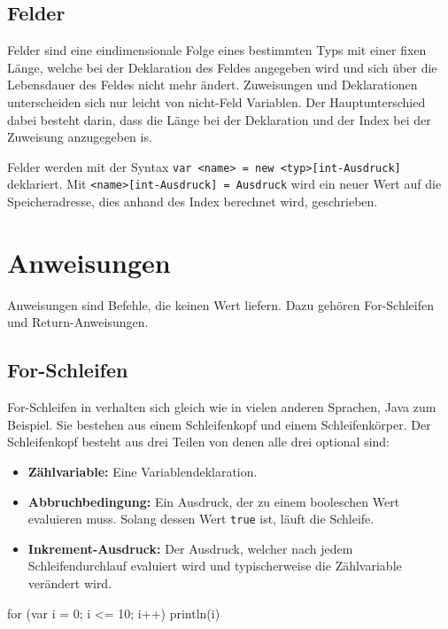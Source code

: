 \subsection{Felder}

Felder sind eine eindimensionale Folge eines bestimmten Typs mit einer fixen Länge, welche bei der Deklaration des Feldes angegeben wird und sich über die Lebensdauer des Feldes nicht mehr ändert. Zuweisungen und Deklarationen unterscheiden sich nur leicht von nicht-Feld Variablen. Der Hauptunterschied dabei besteht darin, dass die Länge bei der Deklaration und der Index bei der Zuweisung anzugegeben is.

Felder werden mit der Syntax \texttt{var <name> = new <typ>[int-Ausdruck]} deklariert. Mit \texttt{<name>[int-Ausdruck] = Ausdruck} wird ein neuer Wert auf die Speicheradresse, dies anhand des Index berechnet wird, geschrieben.

\section{Anweisungen}

Anweisungen sind Befehle, die keinen Wert liefern. Dazu gehören For-Schleifen und Return-Anweisungen.

\subsection{For-Schleifen}

For-Schleifen in \toya verhalten sich gleich wie in vielen anderen Sprachen, Java zum Beispiel. Sie bestehen aus einem Schleifenkopf und einem Schleifenkörper. Der Schleifenkopf besteht aus drei Teilen von denen alle drei optional sind:
\begin{itemize}
    \item \textbf{Zählvariable:} Eine Variablendeklaration.
    \item \textbf{Abbruchbedingung:} Ein Ausdruck, der zu einem booleschen Wert evaluieren muss. Solang dessen Wert \texttt{true} ist, läuft die Schleife.  
    \item \textbf{Inkrement-Ausdruck:} Der Ausdruck, welcher nach jedem Schleifendurchlauf evaluiert wird und typischerweise die Zählvariable verändert wird.
\end{itemize}

\begin{ToyaCode}[numbers=none, caption={Eine For-Schleife, die die Zählvariable auf die Konsole ausgibt.}]
for (var i = 0; i <= 10; i++) {
    println(i)
}
\end{ToyaCode}

